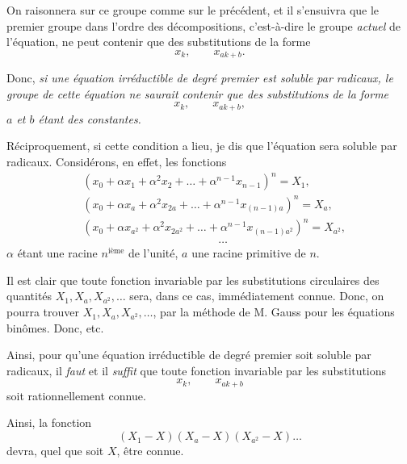 
On raisonnera sur ce groupe comme sur le précédent, et il s'ensuivra
que le premier groupe dans l'ordre des décompositions,
c'est-à-dire le groupe \emph{actuel} de l'équation, ne peut contenir que
des substitutions de la forme
\[
x_{k},\qquad x_{ak+b}.
\]

Donc, {\itshape si une équation irréductible de degré premier est
soluble par radicaux, le groupe de cette équation ne saurait
contenir que des substitutions de la forme
\[
x_{k},\qquad x_{ak+b},
\]
$a$ et $b$ étant des constantes.}

Réciproquement, si cette condition a lieu, je dis que l'équation
sera soluble par radicaux. Considérons, en effet, les fonctions
\[
\begin{aligned}
&(x_{0}+\alpha x_{1}+\alpha^{2}x_{2}+\ldots+\alpha^{n-1}x_{n-1})^{n}=X_{1},\\
&(x_{0}+\alpha x_{a}+\alpha^{2}x_{2a}+\ldots+\alpha^{n-1}x_{(n-1)a})^{n}=X_{a},\\
&(x_{0}+\alpha x_{a^{2}}+\alpha^{2}x_{2a^{2}}+\ldots+\alpha^{n-1}x_{(n-1)a^{2}})^{n}=X_{a^{2}},\\
&\hspace{12em}\ldots
\end{aligned}
\]
$\alpha$ étant une racine $n^{\text{ième}}$ de l'unité, $a$ une racine primitive de $n$.

Il est clair que toute fonction invariable par les substitutions
circulaires des quantités $X_{1},X_{a},X_{a^{2}},\ldots$ sera, dans ce cas, immédiatement
connue. Donc, on pourra trouver $X_{1},X_{a},X_{a^{2}},\ldots$, par
la méthode de M. Gauss pour les équations binômes. Donc, etc.

Ainsi, pour qu'une équation irréductible de degré premier soit
soluble par radicaux, il \emph{faut} et il \emph{suffit} que toute fonction invariable
par les substitutions
\[
x_{k},\qquad x_{ak+b}
\]
soit rationnellement connue.

Ainsi, la fonction
\[
(X_{1}-X)(X_{a}-X)(X_{a^{2}}-X)\ldots
\]
devra, quel que soit $X$, être connue.
